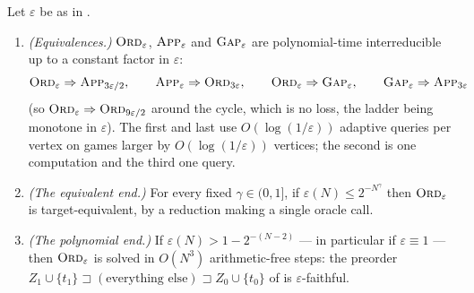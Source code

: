 \begin{theorem}\label{thm:wo-eps-ladder}
Let $\varepsilon$ be as in .
\begin{enumerate}[label=(\alph*),leftmargin=2.2em]
\item \emph{(Equivalences.)} $\textsc{Ord}_\varepsilon$,
  $\textsc{App}_{\varepsilon}$ and $\textsc{Gap}_{\varepsilon}$ are
  polynomial-time interreducible up to a constant factor in $\varepsilon$:
  \[
   \textsc{Ord}_\varepsilon\Rightarrow\textsc{App}_{3\varepsilon/2},\qquad
   \textsc{App}_\varepsilon\Rightarrow\textsc{Ord}_{3\varepsilon},\qquad
   \textsc{Ord}_\varepsilon\Rightarrow\textsc{Gap}_{\varepsilon},\qquad
   \textsc{Gap}_{\varepsilon}\Rightarrow\textsc{App}_{3\varepsilon}
  \]
  (so $\textsc{Ord}_\varepsilon\Rightarrow\textsc{Ord}_{9\varepsilon/2}$ around
  the cycle, which is no loss, the ladder being monotone in $\varepsilon$).
  The first and last use $O(\log(1/\varepsilon))$ adaptive queries per vertex on
  games larger by $O(\log(1/\varepsilon))$ vertices; the second is one
  computation and the third one query.
\item \emph{(The equivalent end.)} For every fixed $\gamma\in(0,1]$, if
  $\varepsilon(N)\le2^{-N^{\gamma}}$ then $\textsc{Ord}_\varepsilon$ is
  target-equivalent, by a reduction making a single oracle call.
\item \emph{(The polynomial end.)} If $\varepsilon(N)>1-2^{-(N-2)}$ --- in
  particular if $\varepsilon\equiv1$ --- then
  $\textsc{Ord}_\varepsilon$ is solved in $O(N^{3})$ arithmetic-free steps: the
  preorder $Z_1\cup\{t_1\}\sqsupset(\text{everything else})\sqsupset
  Z_0\cup\{t_0\}$ of  is $\varepsilon$-faithful.
\end{enumerate}
\end{theorem}

